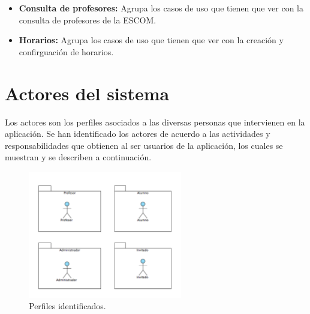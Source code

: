     \begin{itemize}
	\item {\bf Consulta de profesores:} Agrupa los casos de uso que tienen que ver con la consulta de profesores de la ESCOM. 

	
	\item {\bf Horarios:} Agrupa los casos de uso que tienen que ver con la creación y confirguación de horarios.
%	
    \end{itemize}

\section{Actores del sistema}\label{sec:Comportamiento:ActoresSistema}

Los actores son los perfiles asociados a las diversas personas que intervienen en la aplicación. Se han identificado los actores de acuerdo a las actividades y responsabilidades que obtienen al ser usuarios de la aplicación, los cuales se muestran y se describen a continuación.

    \begin{figure}[h!]
      \begin{center}
	  \includegraphics[width=0.6\textwidth]{images/Diagrama_Actores}
      \caption{Perfiles identificados.}
      \label{fig:perfilesPAEAR}
      \end{center}
    \end{figure}

